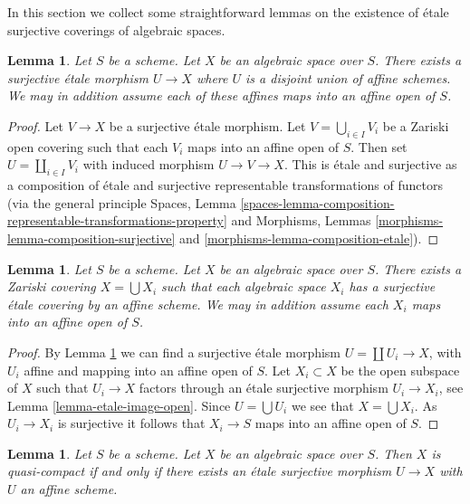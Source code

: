 \documentclass{stacks-project}
\theoremstyle{plain}
\newtheorem{lemma}[subsection]{Lemma}
\theoremstyle{definition}
\theoremstyle{remark}
\numberwithin{equation}{subsection}
\begin{document}
\noindent
In this section we collect some straightforward lemmas on the existence
of \'etale surjective coverings of algebraic spaces.

\begin{lemma}
\label{lemma-cover-by-union-affines}
Let $S$ be a scheme.
Let $X$ be an algebraic space over $S$.
There exists a surjective \'etale morphism $U \to X$ where
$U$ is a disjoint union of affine schemes.
We may in addition assume each of these affines
maps into an affine open of $S$.
\end{lemma}

\begin{proof}
Let $V \to X$ be a surjective \'etale morphism.
Let $V = \bigcup_{i \in I} V_i$ be a Zariski open covering
such that each $V_i$ maps into an affine open of $S$.
Then set $U = \coprod_{i \in I} V_i$ with induced morphism
$U \to V \to X$. This is \'etale and surjective as a composition
of \'etale and surjective representable
transformations of functors (via the general principle
Spaces, Lemma
\ref{spaces-lemma-composition-representable-transformations-property}
and
Morphisms, Lemmas \ref{morphisms-lemma-composition-surjective} and
\ref{morphisms-lemma-composition-etale}).
\end{proof}

\begin{lemma}
\label{lemma-union-of-quasi-compact}
Let $S$ be a scheme.
Let $X$ be an algebraic space over $S$.
There exists a Zariski covering $X = \bigcup X_i$
such that each algebraic space $X_i$ has a surjective
\'etale covering by an affine scheme. We may in addition assume
each $X_i$ maps into an affine open of $S$.
\end{lemma}

\begin{proof}
By Lemma \ref{lemma-cover-by-union-affines} we can find a surjective
\'etale morphism $U = \coprod U_i \to X$, with $U_i$ affine and mapping
into an affine open of $S$. Let $X_i \subset X$ be the open subspace
of $X$ such that $U_i \to X$ factors through an \'etale surjective morphism
$U_i \to X_i$, see
Lemma \ref{lemma-etale-image-open}.
Since $U = \bigcup U_i$ we see that $X = \bigcup X_i$.
As $U_i \to X_i$ is surjective it follows that $X_i \to S$ maps into
an affine open of $S$.
\end{proof}

\begin{lemma}
\label{lemma-quasi-compact-affine-cover}
Let $S$ be a scheme.
Let $X$ be an algebraic space over $S$.
Then $X$ is quasi-compact if and only if
there exists an \'etale surjective morphism $U \to X$
with $U$ an affine scheme.
\end{lemma}
\end{document}
